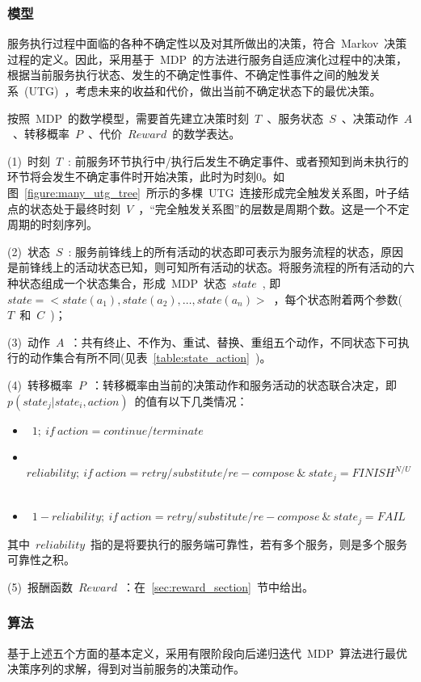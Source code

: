 \subsubsection{模型}

服务执行过程中面临的各种不确定性以及对其所做出的决策，符合~Markov~决策过程的定义。因此，采用基于~MDP~的方法进行服务自适应演化过程中的决策，根据当前服务执行状态、发生的不确定性事件、不确定性事件之间的触发关系~(UTG)~，考虑未来的收益和代价，做出当前不确定状态下的最优决策。

按照~MDP~的数学模型，需要首先建立决策时刻~$T$~、服务状态~$S$~、决策动作~$A$~、转移概率~$P$~、代价~$Reward$~的数学表达。

(1)~时刻~$T$~: 前服务环节执行中/执行后发生不确定事件、或者预知到尚未执行的环节将会发生不确定事件时开始决策，此时为时刻0。如图~\ref{figure:many_utg_tree}~所示的多棵~UTG~连接形成完全触发关系图，叶子结点的状态处于最终时刻~$V$~，“完全触发关系图”的层数是周期个数。这是一个不定周期的时刻序列。

(2)~状态~$S$~: 服务前锋线上的所有活动的状态即可表示为服务流程的状态，原因是前锋线上的活动状态已知，则可知所有活动的状态。将服务流程的所有活动的六种状态组成一个状态集合，形成~MDP~状态~$state$~, 即~$state =  < state({a_1}),state({a_2}), \ldots ,state({a_n}) >$~，每个状态附着两个参数(~$T$~和~$C$~)；

(3)~动作~$A$~：共有终止、不作为、重试、替换、重组五个动作，不同状态下可执行的动作集合有所不同(见表~\ref{table:state_action}~)。

(4)~转移概率~$P$~：转移概率由当前的决策动作和服务活动的状态联合决定，即~$p(state_j|state_i,action)$~的值有以下几类情况：
\begin{itemize}
\item ~$1;~if~action = continue/terminate$~
\item ~$reliability;~if~action = retry/substitute/re-compose~ \& ~ state_j = FINIS{H^{N/U}}$~
\item ~$1 - reliability;~if~action = retry/substitute/re-compose ~\& ~ state_j = FAIL$~
\end{itemize}
其中~$reliability$~指的是将要执行的服务端可靠性，若有多个服务，则是多个服务可靠性之积。

(5)~报酬函数~$Reward$~：在~\ref{sec:reward_section}~节中给出。

\subsubsection{算法}

基于上述五个方面的基本定义，采用有限阶段向后递归迭代~MDP~算法进行最优决策序列的求解，得到对当前服务的决策动作。

